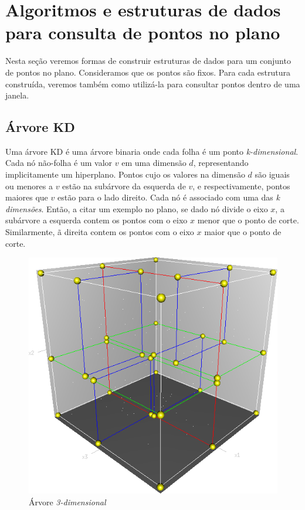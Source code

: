 \chapter{Algoritmos e estruturas de dados para consulta de pontos no plano}\label{cap:desenvolvimento}
Nesta seção veremos formas de construir estruturas de dados para um conjunto de pontos no plano. 
Consideramos que os pontos são fixos. Para cada estrutura construída, veremos também como utilizá-la para
consultar pontos dentro de uma janela.

\section{Árvore KD}

Uma árvore KD é uma árvore binaria onde cada folha é um ponto \textit{k-dimensional}.
Cada nó não-folha é um valor $v$ em uma dimensão $d$, representando implicitamente um hiperplano.
Pontos cujo os valores na dimensão $d$ são iguais ou menores a $v$ estão na subárvore da esquerda de $v$,
e respectivamente, pontos maiores que $v$ estão para o lado direito.
Cada nó é associado com uma das \textit{k dimensões}. Então, a citar um exemplo no plano, se dado nó
 divide o eixo
$x$, a subárvore a esquerda contem os pontos com o eixo $x$ menor que o ponto de corte. Similarmente,
 ã direita contem
os pontos com o eixo $x$ maior que o ponto de corte. 

\begin{figure}[htb]
    \caption{\label{fig:Fig_1}Árvore \textit{3-dimensional}}
    \begin{center}
        \includegraphics[width=\linewidth/2]{./images/3dtree.png}
    \end{center}
\end{figure}

